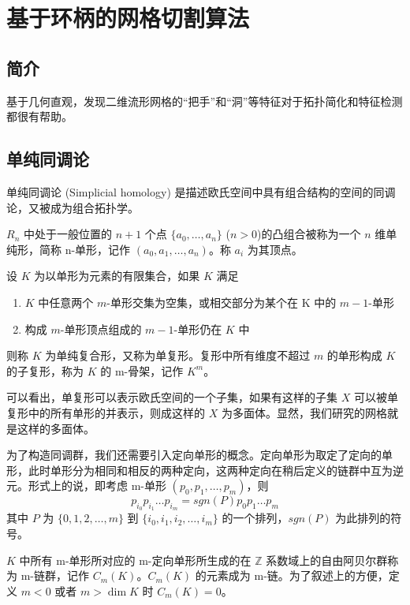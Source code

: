 
\chapter{基于环柄的网格切割算法}

\section{简介}

\citet{oncomputinghantun} 基于几何直观，发现二维流形网格的“把手”和“洞”等特征对于拓扑简化和特征检测都很有帮助。

\section{单纯同调论}

单纯同调论 (Simplicial homology) 是描述欧氏空间中具有组合结构的空间的同调论，又被成为组合拓扑学。

$ R_n $ 中处于一般位置的 $ n + 1 $ 个点 $ \{a_0, \dots, a_n\} $ ($n > 0$)的凸组合被称为一个 $ n $ 维单纯形，简称 n-单形，记作 $ (a_0, a_1, \dots, a_n) $。称 $ a_i$ 为其顶点。

设 $ K $ 为以单形为元素的有限集合，如果 $ K $ 满足
\begin{enumerate}
    \item $ K $ 中任意两个 $m$-单形交集为空集，或相交部分为某个在 K 中的 $m-1$-单形
    \item 构成 $ m$-单形顶点组成的 $ m - 1 $-单形仍在 $ K $ 中
\end{enumerate}
则称 $ K $ 为单纯复合形，又称为单复形。复形中所有维度不超过 $ m $ 的单形构成 $ K $ 的子复形，称为 $ K $ 的 m-骨架，记作 $ K^m $。

可以看出，单复形可以表示欧氏空间的一个子集，如果有这样的子集 $ X $ 可以被单复形中的所有单形的并表示，则成这样的 $ X $ 为多面体。显然，我们研究的网格就是这样的多面体。

为了构造同调群，我们还需要引入定向单形的概念。定向单形为取定了定向的单形，此时单形分为相同和相反的两种定向，这两种定向在稍后定义的链群中互为逆元。形式上的说，即考虑 m-单形 $ (p_0, p_1, \dots, p_m) $，则 
$$ p_{i_0} p_{i_1} \dots p_{i_m} = sgn(P) p_{0} p_{1} \dots p_{m} $$
其中 $ P $ 为 $ \{0, 1, 2, \dots, m \} $ 到 $ \{i_0, i_1, i_2, \dots, i_m \} $ 的一个排列，$ sgn(P) $ 为此排列的符号。

$ K $ 中所有 m-单形所对应的 m-定向单形所生成的在 $ \mathbb{Z} $ 系数域上的自由阿贝尔群称为 m-链群，记作 $ C_m(K) $。$ C_m(K) $ 的元素成为 m-链。为了叙述上的方便，定义 $ m < 0 $ 或者 $ m > \dim K $ 时 $ C_m(K) = 0 $。

